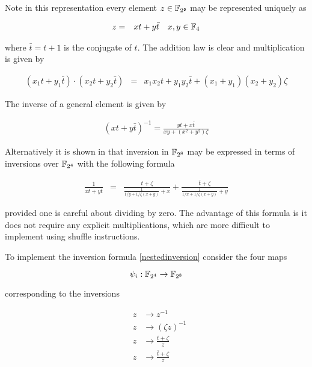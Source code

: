 \documentclass[a4paper]{article}
\numberwithin{equation}{section}
\begin{document}
Note in this representation every element $z \in \mathbb{F}_{2^8}$ may be represented uniquely as

\begin{eqnarray*}
   z &=&  x t + y \bar{t} \quad x,y \in \mathbb{F}_4
\end{eqnarray*}

where $\bar{t} = t + 1$ is the conjugate of $t$. The addition law is clear and multiplication is given by

\begin{eqnarray*}
 (x_1 t + y_1 \bar{t}) \cdot (x_2 t + y_2 \bar{t} ) &=& x_1 x_2 t + y_1 y_2 \bar{t} + \left( x_1 + y_1 \right) \left( x_2 + y_2 \right) \zeta
\end{eqnarray*}

The inverse of a general element is given by

\begin{eqnarray*}
\left( xt + y \bar{t} \right)^{-1} = \frac{yt + x \bar{t}}{xy + \left(x^2 + y^2\right)\zeta}
\end{eqnarray*}

Alternatively it is shown in \cite{Hamburg2009AES} that inversion in $\mathbb{F}_{2^8}$ may be expressed in terms of inversions over $\mathbb{F}_{2^4}$  with the following formula

\begin{eqnarray}
\label{nestedinversion}
\frac{1}{xt + y \bar{t}} &=& \frac{t + \zeta}{\frac{1}{1 / y  + 1/\zeta(x+y)} + x}+\frac{\bar{t} + \zeta}{\frac{1}{1 / x  + 1/\zeta(x+y)} + y}
\end{eqnarray}

provided one is careful about dividing by zero. The advantage of this formula is it does not require any explicit multiplications, which are more difficult to implement using shuffle instructions.

To implement the inversion formula \eqref{nestedinversion} consider the four maps

	$$ \psi_i : \mathbb{F}_{2^4}  \rightarrow \mathbb{F}_{2^8} $$

corresponding to the inversions 

\begin{eqnarray*}
 & z &\rightarrow z^{-1} \\
 & z &\rightarrow \left( \zeta z \right)^{-1} \\
 & z &\rightarrow \frac{t + \zeta}{z} \\
 & z &\rightarrow \frac{\bar{t} + \zeta}{z}
\end{eqnarray*}
\end{document}
